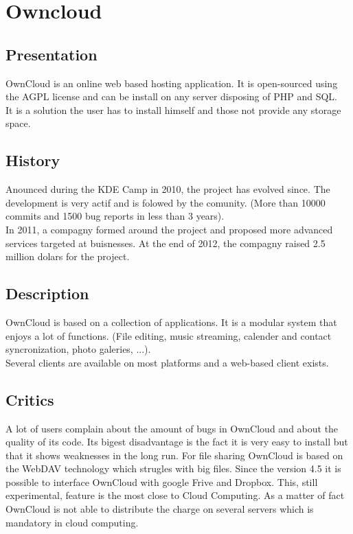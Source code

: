 \section{Owncloud}
\thispagestyle{EIP} %
\subsection{Presentation}
OwnCloud is an online web based hosting application. It is open-sourced using the AGPL license and can be install on any server disposing of PHP and SQL.\\
It is a solution the user has to install himself and those not provide any storage space.\\

\subsection{History}
Anounced during the KDE Camp in 2010, the project has evolved since. The development is very actif and is folowed by the comunity. (More than 10000 commits and 1500 bug reports in less than 3 years).\\

In 2011, a compagny formed around the project and proposed more advanced services targeted at buisnesses. At the end of 2012, the compagny raised 2.5 million dolars for the project.

\subsection{Description}
OwnCloud is based on a collection of applications. It is a modular system that enjoys a lot of functions. (File editing, music streaming, calender and contact syncronization, photo galeries, ...).\\
Several clients are available on most platforms and a web-based client exists.\\

\subsection{Critics}
A lot of users complain about the amount of bugs in OwnCloud and about the quality of its code. Its bigest disadvantage is the fact it is very easy to install but that it shows weaknesses in the long run.
For file sharing OwnCloud is based on the WebDAV technology which strugles with big files.
Since the version 4.5 it is possible to interface OwnCloud with google Frive and Dropbox. This, still experimental, feature is the most close to Cloud Computing. As a matter of fact OwnCloud is not able to distribute the charge on several servers which is mandatory in cloud computing.
